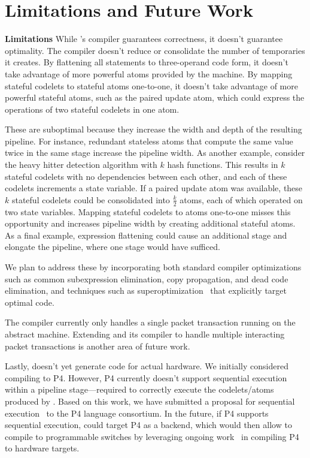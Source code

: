 \section{Limitations and Future Work}
\label{s:limitations}

\textbf{Limitations}
While \pktlanguage's compiler guarantees correctness, it doesn't guarantee
optimality.  The \pktlanguage compiler doesn't reduce or consolidate the number
of temporaries it creates. By flattening all statements to three-operand code
form, it doesn't take advantage of more powerful atoms provided by the
\absmachine machine. By mapping stateful codelets to stateful atoms
one-to-one, it doesn't take advantage of more powerful stateful atoms, such as
the paired update atom, which could express the operations of two stateful
codelets in one atom.

These are suboptimal because they increase the width and depth of the resulting
pipeline. For instance, redundant stateless atoms that compute the same value
twice in the same stage increase the pipeline width. As another example,
consider the heavy hitter detection algorithm with $k$ hash functions.  This
results in $k$ stateful codelets with no dependencies between each other, and
each of these codelets increments a state variable. If a paired update atom was
available, these $k$ stateful codelets could be consolidated into $\frac{k}{2}$
atoms, each of which operated on two state variables.  Mapping stateful
codelets to atoms one-to-one misses this opportunity and increases pipeline
width by creating additional stateful atoms.  As a final example, expression
flattening could cause an additional stage and elongate the pipeline, where one
stage would have sufficed.

We plan to address these by incorporating both standard compiler optimizations
such as common subexpression elimination, copy propagation, and dead code
elimination, and techniques such as superoptimization~\cite{stoke,
superoptimizer} that explicitly target optimal code.

The \pktlanguage compiler currently only handles a single packet transaction
running on the abstract machine.  Extending \pktlanguage and its compiler to
handle multiple interacting packet transactions is another area of future work.

Lastly, \pktlanguage doesn't yet generate code for actual hardware. We
initially considered compiling \pktlanguage to P4. However, P4 currently
doesn't support sequential execution within a pipeline stage---required to
correctly execute the codelets/atoms produced by \pktlanguage. Based on this
work, we have submitted a proposal for sequential execution~\cite{p4-semantics}
to the P4 language consortium. In the future, if P4 supports sequential
execution, \pktlanguage could target P4 as a backend, which would then allow
\pktlanguage to compile to programmable switches by leveraging ongoing
work~\cite{netronome, xilinx,lavanya_compiler} in compiling P4 to hardware
targets.

